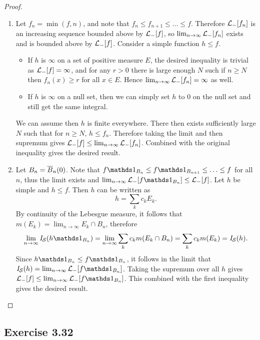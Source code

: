 \documentclass[hw_all.tex]{subfiles}
\begin{document}
\begin{proof}
\begin{enumerate}
        \item 
            Let $f_n = \min(f, n)$, and note that $f_n \leq f_{n+1} \leq \ldots \leq f$. Therefore $\mathcal{L}_{-}[f_n]$ is an increasing sequence bounded above by $\mathcal{L}_{-}[f]$, so $\lim_{n \to \infty} \mathcal{L}_{-}[f_n]$ exists and is bounded above by $\mathcal{L}_{-}[f]$. Consider a simple function $h \leq f$. 
            \begin{itemize}
                \item If $h$ is $\infty$ on a set of positive measure $E$, the desired inequality is trivial as $\mathcal{L}_{-}[f] = \infty$, and for any $r > 0$ there is large enough $N$ such if $n \geq N$ then $f_n(x) \geq r$ for all $x \in E$. Hence $\lim_{n \to \infty} \mathcal{L}_{-}[f_n] = \infty$ as well. 

                \item If $h$ is $\infty$ on a null set, then we can simply set $h$ to $0$ on the null set and still get the same integral.
            \end{itemize}

            We can assume then $h$ is finite everywhere. There then exists sufficiently large $N$ such that for $n \geq N$, $h \leq f_n$. Therefore taking the limit and then supremum gives $\mathcal{L}_{-}[f] \leq \lim_{n \to \infty} \mathcal{L}_{-}[f_n]$. Combined with the original inequality gives the desired result.

        \item 
            Let $B_n = \overline{B}_{n}(0)$. Note that $f \ind{B_n} \leq f \ind{B_{n+1}} \leq \ldots \leq f$ for all $n$, thus the limit exists and $\lim_{n \to \infty} \lint[f \ind{B_n}] \leq \lint[f]$. Let $h$ be simple and $h \leq f$. Then $h$ can be written as
            \[
                h = \sum_{k} c_k E_k
            .\]
            By continuity of the Lebesgue measure, it follows that $m(E_k) = \lim_{n \to \infty} E_k \cap B_n$, therefore
            \[
                \lim_{n \to \infty} \sint(h \ind{B_n}) = \lim_{n \to \infty} \sum_k c_k m(E_k \cap B_n) = \sum_k c_k m(E_k) = \sint(h)
            .\]
            Since $h \ind{B_n} \leq f \ind{B_n}$, it follows in the limit that $\sint(h) = \lim_{n \to \infty} \lint[f \ind{B_n}]$. Taking the supremum over all $h$ gives $\lint[f] \leq \lim_{n\to \infty} \lint[f \ind{B_n}]$. This combined with the first inequality gives the desired result.
    \end{enumerate}
\end{proof}

\subsection{Exercise 3.32}
\end{document}
